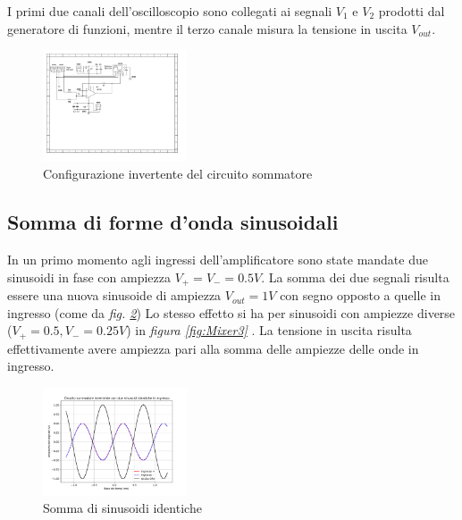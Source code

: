 \documentclass[journal]{IEEEtran}
\begin{document}
I primi due canali dell'oscilloscopio sono collegati ai segnali $V_1$ e $V_2$ prodotti dal generatore di funzioni, mentre il terzo canale misura la tensione in uscita $V_{out}$.


\begin{figure}[H]%
\begin {center}
\includegraphics[width=0.38\textwidth]{sch-simulations/output/OPA-mixer.pdf}
\caption{Configurazione invertente del circuito sommatore}
\label{fig:OPA-mixer}
\end {center}
\end{figure}
\subsection{Somma di forme d'onda sinusoidali}
In un primo momento agli ingressi dell'amplificatore sono state mandate due sinusoidi in fase con ampiezza $V_+ = V_- = 0.5 V$. La somma dei due segnali risulta essere una nuova sinusoide di ampiezza $V_{out} = 1 V$ con segno opposto a quelle in ingresso (come da \textit{fig. \ref{fig:Mixer1}})
Lo stesso effetto si ha per sinusoidi con ampiezze diverse ($V_+ = 0.5, V_- = 0.25 V$) in \textit{figura \ref{fig:Mixer3} }. La tensione in uscita risulta effettivamente avere ampiezza pari alla somma delle ampiezze delle onde in ingresso.

\begin{figure}[H]%
\begin {center}
\includegraphics[width=0.38\textwidth]{analysis/output/OPA_mixer_sin0.pdf}
\caption{Somma di sinusoidi identiche}
\label{fig:Mixer1}
\end {center}
\end{figure}
\end{document}
